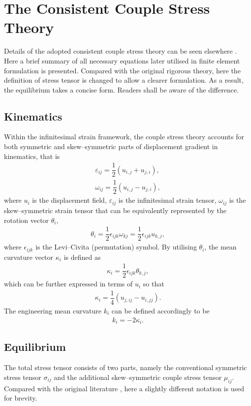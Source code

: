 \documentclass[3p,sort&compress,11pt,fleqn,review]{elsarticle}
\begin{document}
\section{The Consistent Couple Stress Theory}
Details of the adopted consistent couple stress theory can be seen elsewhere \citep{Hadjesfandiari2011}. Here a brief summary of all necessary equations later utilised in finite element formulation is presented. Compared with the original rigorous theory, here the definition of stress tensor is changed to allow a clearer formulation. As a result, the equilibrium takes a concise form. Readers shall be aware of the difference.
\subsection{Kinematics}
Within the infinitesimal strain framework, the couple stress theory \citep{Hadjesfandiari2011} accounts for both symmetric and skew--symmetric parts of displacement gradient in kinematics, that is
\begin{gather}\label{eq:varepsilon}
\varepsilon_{ij}=\dfrac{1}{2}\left(u_{i,j}+u_{j,i}\right),\\
\omega_{ij}=\dfrac{1}{2}\left(u_{i,j}-u_{j,i}\right),
\end{gather}
where $u_i$ is the displacement field, $\varepsilon_{ij}$ is the infinitesimal strain tensor, $\omega_{ij}$ is the skew--symmetric strain tensor that can be equivalently represented by the rotation vector $\theta_i$,
\begin{gather}\label{eq:theta}
\theta_i=\dfrac{1}{2}\epsilon_{ijk}\omega_{kj}=\dfrac{1}{2}\epsilon_{ijk}u_{k,j},
\end{gather}
where $\epsilon_{ijk}$ is the Levi--Civita (permutation) symbol. By utilising $\theta_i$, the mean curvature vector $\kappa_i$ is defined as
\begin{gather}\label{eq:kappa}
\kappa_i=\dfrac{1}{2}\epsilon_{ijk}\theta_{k,j},
\end{gather}
which can be further expressed in terms of $u_i$ so that
\begin{gather}
\kappa_i=\dfrac{1}{4}\left(u_{j,ij}-u_{i,jj}\right).
\end{gather}
The engineering mean curvature $k_i$ can be defined accordingly to be
\begin{gather}
k_i=-2\kappa_i.
\end{gather}
\subsection{Equilibrium}
The total stress tensor consists of two parts, namely the conventional symmetric stress tensor $\sigma_{ij}$ and the additional skew--symmetric couple stress tensor $\mu_{ij}$. Compared with the original literature \citep{Hadjesfandiari2011}, here a slightly different notation is used for brevity.
\end{document}
